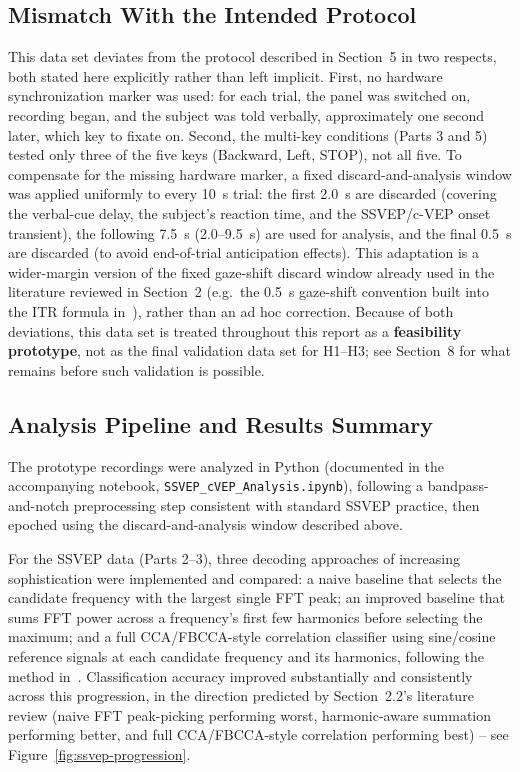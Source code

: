 \documentclass[11pt]{article}
\begin{document}
\subsection{Mismatch With the Intended Protocol}

This data set deviates from the protocol described in Section~5 in two respects, both stated here explicitly rather than left implicit. First, no hardware synchronization marker was used: for each trial, the panel was switched on, recording began, and the subject was told verbally, approximately one second later, which key to fixate on. Second, the multi-key conditions (Parts 3 and 5) tested only three of the five keys (Backward, Left, STOP), not all five. To compensate for the missing hardware marker, a fixed discard-and-analysis window was applied uniformly to every 10~s trial: the first 2.0~s are discarded (covering the verbal-cue delay, the subject's reaction time, and the SSVEP/c-VEP onset transient), the following 7.5~s (2.0--9.5~s) are used for analysis, and the final 0.5~s are discarded (to avoid end-of-trial anticipation effects). This adaptation is a wider-margin version of the fixed gaze-shift discard window already used in the literature reviewed in Section~2 (e.g.\ the 0.5~s gaze-shift convention built into the ITR formula in~\cite{chen2015pnas}), rather than an ad hoc correction. Because of both deviations, this data set is treated throughout this report as a \textbf{feasibility prototype}, not as the final validation data set for H1--H3; see Section~8 for what remains before such validation is possible.

\subsection{Analysis Pipeline and Results Summary}

The prototype recordings were analyzed in Python (documented in the accompanying notebook, \texttt{SSVEP\_cVEP\_Analysis.ipynb}), following a bandpass-and-notch preprocessing step consistent with standard SSVEP practice, then epoched using the discard-and-analysis window described above.

For the SSVEP data (Parts 2--3), three decoding approaches of increasing sophistication were implemented and compared: a naive baseline that selects the candidate frequency with the largest single FFT peak; an improved baseline that sums FFT power across a frequency's first few harmonics before selecting the maximum; and a full CCA/FBCCA-style correlation classifier using sine/cosine reference signals at each candidate frequency and its harmonics, following the method in~\cite{lin2007cca,chen2015fbcca}. Classification accuracy improved substantially and consistently across this progression, in the direction predicted by Section~2.2's literature review (naive FFT peak-picking performing worst, harmonic-aware summation performing better, and full CCA/FBCCA-style correlation performing best) -- see Figure~\ref{fig:ssvep-progression}.
\end{document}
